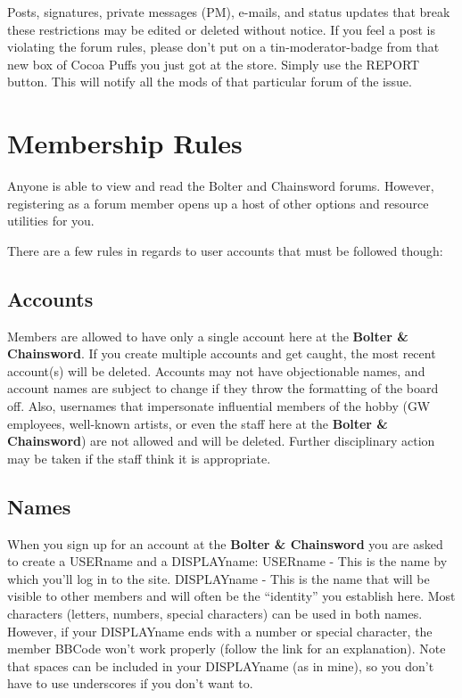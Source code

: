 \documentclass[12pt]{article}
\newcommand{\bnc}{{\textbf{Bolter \& Chainsword}}}%
\begin{document}
Posts, signatures, private messages (PM), e-mails, and status updates 
that break these restrictions may be edited or deleted without notice. 
If you feel a post is violating the forum rules, please don't put on a 
tin-moderator-badge from that new box of Cocoa Puffs you just got at 
the store. Simply use the REPORT button. This will notify all the mods 
of that particular forum of the issue.


\section{Membership Rules}


Anyone is able to view and read the Bolter and Chainsword forums. 
However, registering as a forum member opens up a host of other options 
and resource utilities for you.

There are a few rules in regards to user accounts that must be followed 
though:

\subsection{Accounts}


Members are allowed to have only a single account here at the 
{\bnc}. If you create multiple accounts and get caught, the most 
recent account(s) will be deleted. Accounts may not have objectionable 
names, and account names are subject to change if they throw the 
formatting of the board off. Also, usernames that impersonate 
influential members of the hobby (GW employees, well-known artists, or 
even the staff here at the {\bnc}) are not allowed and 
will be deleted. Further disciplinary action may be taken if the staff 
think it is appropriate.

\subsection{Names}

When you sign up for an account at the {\bnc} you are asked to create a 
USERname and a DISPLAYname:
USERname - This is the name by which you'll log in to the site.
DISPLAYname - This is the name that will be visible to other members 
and will often be the ``identity'' you establish here.
Most characters (letters, numbers, special characters) can be used in 
both names. However, if your DISPLAYname ends with a number or special 
character, the member BBCode won't work properly (follow the link for 
an explanation). Note that spaces can be included in your DISPLAYname 
(as in mine), so you don't have to use underscores if you don't want to.
\end{document}
